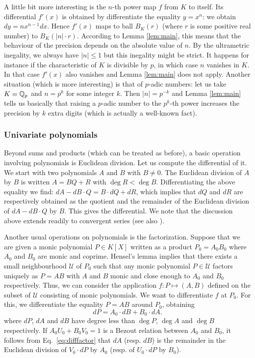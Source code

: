 \documentclass{amsart}
\begin{document}
A little bit more interesting is the $n$-th power map $f$ from $K$ to 
itself. Its differential $f'(x)$ is obtained by differentiate the 
equality $y = x^n$: we obtain $dy = n x^{n-1} dx$.
Hence $f'(x)$ maps to ball $B_K(r)$ (where $r$ is some positive real 
number) to $B_K(|n|{\cdot} r)$. According to Lemma \ref{lem:main}, this 
means that the behaviour of the precision depends on the absolute value 
of $n$. By the ultrametric inegality, we always have $|n| \leq 1$ but 
this inegality might be strict. It happens for instance if the 
characteristic of $K$ is divisible by $p$, in which case $n$ vanishes in 
$K$. In that case $f'(x)$ also vanishes and Lemma \ref{lem:main} does 
not apply. 
Another situation (which is more interesting) is that of $p$-adic 
numbers: let us take $K = \mathbb Q_p$ and $n = p^k$ for some integer $k$. Then
$|n| = p^{-k}$ and Lemma \ref{lem:main} tells us basically that raising
a $p$-adic number to the $p^k$-th power increases the precision by $k$
extra digits (which is actually a well-known fact).

\subsubsection*{Univariate polynomials}

Beyond sums and products (which can be treated as before), a basic 
operation involving polynomials is Euclidean division. Let us compute 
the differential of it. We start with two polynomials $A$ and $B$ with 
$B \neq 0$. The Euclidean division of $A$ by $B$ is written $A = BQ + R$ 
with $\deg R < \deg B$. Differentiating the above equality we find: 
$dA - dB \cdot Q = B \cdot dQ + dR$,
which implies that $dQ$ and $dR$ are respectively obtained as the 
quotient and the remainder of the Euclidean division of $dA - dB \cdot 
Q$ by $B$. This gives the differential. We note that the discussion 
above extends readily to convergent series (see also 
\cite{Caruso-Lubicz}).

Another usual operations on polynomials is the factorization. Suppose 
that we are given a monic polynomial $P \in K[X]$ written as a product 
$P_0 = A_0 B_0$ where $A_0$ and $B_0$ are monic and coprime. Hensel's 
lemma implies that there exists a small neighbourhood $\mathcal U$ of 
$P_0$ such that any monic polynomial $P \in \mathcal U$ factors uniquely 
as $P = A B$ with $A$ and $B$ monic and close enough to $A_0$ and $B_0$ 
respectively. Thus, we can consider the application $f : P \mapsto (A,B)$ 
defined on the subset of $\mathcal U$ consisting of monic polynomials.
We want to differentiate $f$ at $P_0$. For this, we differentiate the 
equality $P = A B$ around $P_0$, obtaining 
\begin{equation}
\label{eq:difffactor}
dP = A_0 \cdot dB + B_0 \cdot dA.
\end{equation}
where $dP$, $dA$ and $dB$ have degree less than $\deg P$, $\deg A$ and 
$\deg B$ respectively. If $A_0 U_0 + B_0 V_0 = 1$ is a Bezout relation
between $A_0$ and $B_0$, it follows from Eq.~\eqref{eq:difffactor} that
$dA$ (resp. $dB$) is the remainder in the Euclidean division of $V_0
{\cdot} dP$ by $A_0$ (resp. of $U_0 {\cdot} dP$ by $B_0$).
\end{document}

